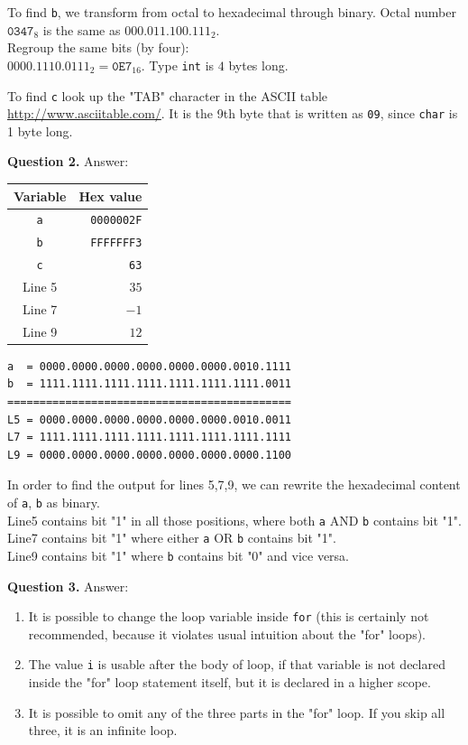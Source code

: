 \documentclass[11pt]{article}
\begin{document}
To find {\tt b}, we transform from octal to hexadecimal through binary. 
Octal number $\mathtt{0347}_8$ is the 
same as $\mathtt{000.011.100.111}_2$.\\
Regroup the same bits (by four):\\
$\mathtt{0000.1110.0111}_2 = \mathtt{0E7}_{16}$. 
Type {\tt int} is $4$ bytes long.

To find {\tt c} look up the "TAB" character in the 
ASCII table \url{http://www.asciitable.com/}. 
It is the 9th byte that is written as {\tt 09}, since
{\tt char} is 1 byte long.

\vspace{20pt}
{\bf Question 2.} Answer:

\begin{tabular}{|c|r|} \hline
{\bf Variable} & {\bf Hex value} \\ \hline
{\tt a} & {\tt 0000002F} \\ \hline
{\tt b} & {\tt FFFFFFF3} \\ \hline
{\tt c} & {\tt 63} \\ \hline
Line 5 & $35$ \\ \hline
Line 7 & $-1$ \\ \hline
Line 9 & $12$ \\ \hline
\end{tabular}

{\footnotesize
\begin{verbatim}
a  = 0000.0000.0000.0000.0000.0000.0010.1111
b  = 1111.1111.1111.1111.1111.1111.1111.0011
============================================
L5 = 0000.0000.0000.0000.0000.0000.0010.0011
L7 = 1111.1111.1111.1111.1111.1111.1111.1111
L9 = 0000.0000.0000.0000.0000.0000.0000.1100
\end{verbatim}
}

In order to find the output for lines 5,7,9, we
can rewrite the hexadecimal content of {\tt a}, {\tt b}
as binary.\\
Line5 contains bit "1" 
in all those positions, where both {\tt a} AND {\tt b}
contains bit "1".\\
Line7 contains bit "1" where either {\tt a} OR {\tt b} 
contains bit "1".\\
Line9 contains bit "1" where {\tt b} contains bit "0" and vice versa.



\vspace{20pt}
{\bf Question 3.} Answer:

\begin{enumerate}
\item It is possible to change the loop variable inside {\tt for}
(this is certainly not recommended, because it violates usual 
intuition about the "for" loops). 
\item The value {\tt i} is usable after the body of loop, if
that variable is not declared inside the "for" loop statement itself,
but it is declared in a higher scope.
\item It is possible to omit any of the three parts in the "for" loop. 
If you skip all three, it is an infinite loop.
\end{enumerate}
\end{document}

